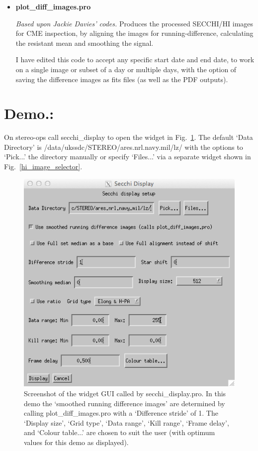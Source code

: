 \documentclass[12pt, a4paper, oneside]{article}
\begin{document}
\begin{itemize}
\begin{multicols}{3}
\begin{itemize}
\end{itemize}
\end{multicols}
\item {\bf plot\_diff\_images.pro}

\emph{Based upon Jackie Davies' codes.} Produces the processed SECCHI/HI images for CME inspection, by aligning the images for running-difference, calculating the resistant mean and smoothing the signal.

I have edited this code to accept any specific start date and end date, to work on a single image or subset of a day or multiple days, with the option of saving the difference images as fits files (as well as the PDF outputs). 

\end{itemize}

\vskip 0.1in

\section{Demo.:}


On stereo-ops call secchi\_display to open the widget in Fig.~\ref{secchi_display}. The default `Data Directory' is /data/ukssdc/STEREO/ares.nrl.navy.mil/lz/ with the options to `Pick...' the directory manually or specify `Files...' via a separate widget shown in Fig.~\ref{hi_image_selector}.

\begin{figure}[]
\centering
\includegraphics[scale=0.8, trim=0 0 0 0, clip=true]{secchi_display.png}
\caption{Screenshot of the widget GUI called by secchi\_display.pro. In this demo the `smoothed running difference images' are determined by calling plot\_diff\_images.pro with a `Difference stride' of 1. The `Display size', `Grid type', `Data range', `Kill range', `Frame delay', and `Colour table...' are chosen to suit the user (with optimum values for this demo as displayed).}
\label{secchi_display}
\end{figure}
\end{document}

